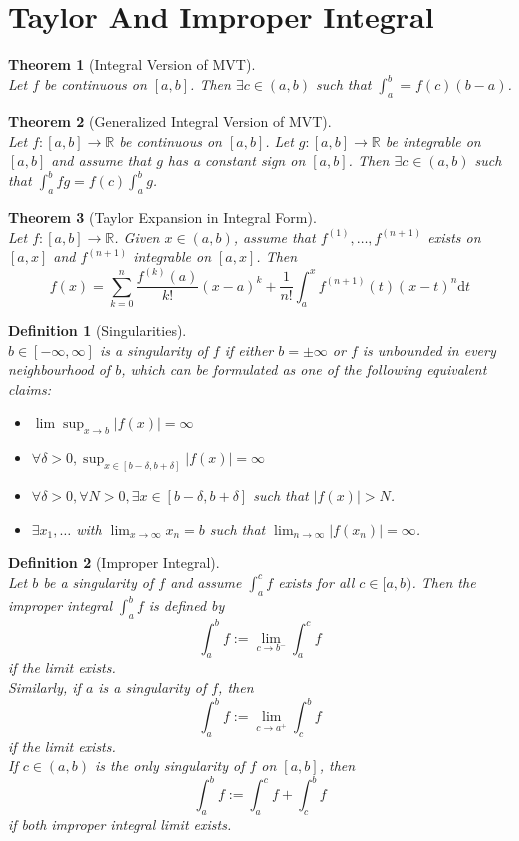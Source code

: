 \documentclass[12pt]{article}
\newcommand{\diff}{\mathrm{d}}
\newtheorem{definition}{Definition}[section]
\newtheorem{theorem}{Theorem}[section]
\theoremstyle{definition}
\begin{document}
\section{Taylor And Improper Integral}
\begin{theorem}[Integral Version of MVT]
\hfill\\\normalfont Let $f$ be continuous on $[a,b]$. Then $\exists c\in(a,b)$ such that $\int_a^b = f(c)(b-a)$.
\end{theorem}
\begin{theorem}[Generalized Integral Version of MVT]
\hfill\\\normalfont Let $f:[a,b]\to\mathbb{R}$ be continuous on $[a,b]$. Let $g:[a,b]\to\mathbb{R}$ be integrable on $[a,b]$ and assume that $g$ has a \textit{constant} sign on $[a,b]$. Then $\exists c\in(a,b)$ such that $\int_a^b fg=f(c)\int_a^b g$.
\end{theorem}
\begin{theorem}[Taylor Expansion in Integral Form]
\hfill\\\normalfont Let $f:[a,b]\to\mathbb{R}$. Given $x\in(a,b)$, assume that $f^{(1)}, \ldots, f^{(n+1)}$ exists on $[a,x]$ and $f^{(n+1)}$ integrable on $[a,x]$. Then
\[
f(x)=\sum_{k=0}^n \frac{f^{(k)}(a)}{k!}(x-a)^k + \frac{1}{n!}\int_a^x f^{(n+1)}(t)(x-t)^n\diff t
\]
\end{theorem}
\begin{definition}[Singularities]
\hfill\\\normalfont $b\in[-\infty, \infty]$ is a singularity of $f$ if either $b=\pm\infty$ or $f$ is unbounded in every neighbourhood of $b$, which can be formulated as one of the following equivalent claims:
\begin{itemize}
	\item $\lim\sup_{x\to b}|f(x)|=\infty$
	\item $\forall \delta>0, \sup_{x\in [b-\delta, b+\delta]} |f(x)|=\infty$
	\item $\forall \delta>0, \forall N>0, \exists x\in[b-\delta, b+\delta]$ such that $|f(x)|>N$.
	\item $\exists x_1,\ldots$ with $\lim_{x\to\infty} x_n=b$ such that $\lim_{n\to\infty}|f(x_n)|=\infty$.
\end{itemize}
\end{definition}
\begin{definition}[Improper Integral]
\hfill\\\normalfont Let $b$ be a singularity of $f$ and assume $\int_a^c f$ exists for all $c\in[a,b)$. Then the improper integral $\int_a^bf$ is defined by 
\[
\int_a^b f:=\lim_{c\to b^-}\int_a^c f
\]
if the limit exists.\\
Similarly, if $a$ is a singularity of $f$, then
\[
\int_a^b f:=\lim_{c\to a^+}\int_c^b f
\]
if the limit exists.\\
If $c\in(a,b)$ is the only singularity of $f$ on $[a,b]$, then
\[
\int_a^b f:=\int_a^c f+\int_c^bf
\]
if both improper integral limit exists.
\end{definition}
\end{document}
